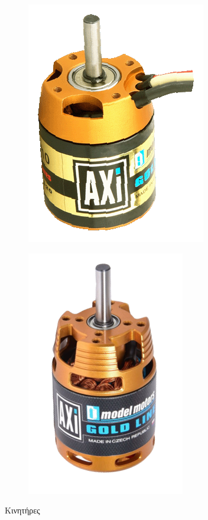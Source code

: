 \begin{figure}[hbt!]
    \begin{subfigure}{0.48\textwidth}
        \centering
        \includegraphics[scale=0.3]{Motor/AXI2826_10_GL_1.png} 
        \caption{}
        \label{AXI2826}
    \end{subfigure}
    \begin{subfigure}{0.48\textwidth}
        \centering
        \includegraphics[scale=0.3]{Motor/AXI2220_12_v2_long_1.png}
        \caption{}
        \label{AXI2200}
    \end{subfigure}
    \caption{ Κινητήρες}
    \label{fig:image2}
\end{figure}

